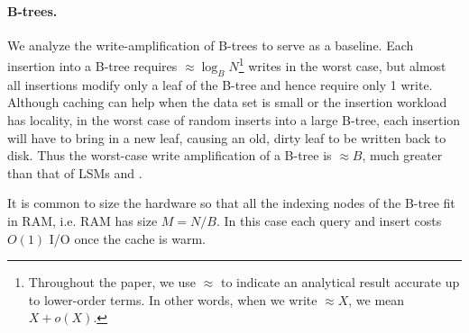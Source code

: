 

\paragraph{B-trees.}
We analyze the write-amplification of B-trees to serve
as a baseline.
Each insertion into a B-tree requires $\approx \log_B
N$\footnote{Throughout the paper, we use $\approx$ to indicate an
  analytical result accurate up to lower-order terms.  In other words,
  when we write $\approx X$, we mean $X+o(X)$.} writes in the worst
case, but almost all insertions modify only a leaf of the B-tree and
hence require only 1 write.
Although caching can help when the data set is small or the insertion
workload has locality, in the worst case of random inserts into a
large B-tree, each insertion will have to bring in a new leaf, causing
an old, dirty leaf to be written back to disk.  Thus the worst-case
write amplification of a B-tree is $\approx B$, much
greater than that of LSMs and \bets.

It is common to size the hardware so that all the indexing nodes of
the B-tree fit in RAM, i.e. RAM has size $M=N/B$.  In this case each
query and insert costs $O(1)$ I/O once the cache is warm.

